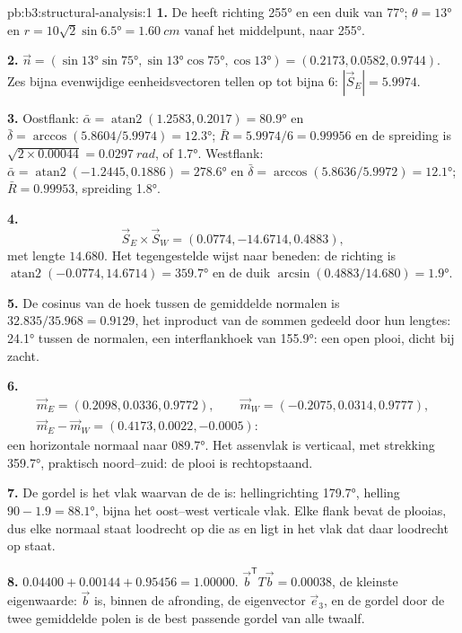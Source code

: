 \begin{solution}{pb:b3:structural-analysis:1}
\textbf{1.} De  heeft richting \ang{255} en een duik van \ang{77}; $\theta =
\ang{13}$ en $r = 10\sqrt2\sin\ang{6.5} = \qty{1.60}{cm}$ vanaf het middelpunt,
naar \ang{255}.

\textbf{2.} $\vec n = (\sin\ang{13}\sin\ang{75}, \sin\ang{13}\cos\ang{75},
\cos\ang{13}) = (0.2173, 0.0582, 0.9744)$. Zes bijna evenwijdige eenheidsvectoren
tellen op tot bijna 6: $|\vec S_E| = 5.9974$.

\textbf{3.} Oostflank: $\bar\alpha = \operatorname{atan2}(1.2583, 0.2017) =
\ang{80.9}$ en $\bar\delta = \arccos(5.8604/5.9974) = \ang{12.3}$; $\bar R
= 5.9974/6 = 0.99956$ en de spreiding is $\sqrt{2\times0.00044} =
\qty{0.0297}{rad}$, of \ang{1.7}. Westflank: $\bar\alpha =
\operatorname{atan2}(-1.2445, 0.1886) = \ang{278.6}$ en $\bar\delta =
\arccos(5.8636/5.9972) = \ang{12.1}$; $\bar R = 0.99953$, spreiding \ang{1.8}.

\textbf{4.}
\[
  \vec S_E\times\vec S_W = (0.0774, -14.6714, 0.4883),
\]
met lengte $14.680$. Het tegengestelde wijst naar beneden: de richting is $\operatorname{atan2}(-0.0774, 14.6714) = \ang{359.7}$ en de
duik $\arcsin(0.4883/14.680) = \ang{1.9}$.

\textbf{5.} De cosinus van de hoek tussen de gemiddelde normalen is
$32.835/35.968 = 0.9129$, het inproduct van de sommen gedeeld door hun
lengtes: \ang{24.1} tussen de normalen, een interflankhoek van \ang{155.9}:
een open plooi, dicht bij zacht.

\textbf{6.}
\begin{gather*}
  \vec m_E = (0.2098, 0.0336, 0.9772),\qquad \vec m_W = (-0.2075, 0.0314, 0.9777),\\
  \vec m_E - \vec m_W = (0.4173, 0.0022, -0.0005):
\end{gather*}
een horizontale normaal naar \ang{089.7}. Het assenvlak is verticaal, met strekking
\ang{359.7}, praktisch noord--zuid: de plooi is rechtopstaand.

\textbf{7.} De gordel is het vlak waarvan de  de  is: hellingrichting
\ang{179.7}, helling $90 - 1.9 = \ang{88.1}$, bijna het oost--west verticale
vlak. Elke flank bevat de plooias, dus elke normaal staat loodrecht
op die as en ligt in het vlak dat daar loodrecht op staat.

\textbf{8.} $0.04400 + 0.00144 + 0.95456 = 1.00000$. $\vec b^{\mathsf T}T\vec
b = 0.00038$, de kleinste eigenwaarde: $\vec b$ is, binnen de afronding, de
eigenvector $\vec e_3$, en de gordel door de twee gemiddelde polen is de
best passende gordel van alle twaalf.


\end{solution}
